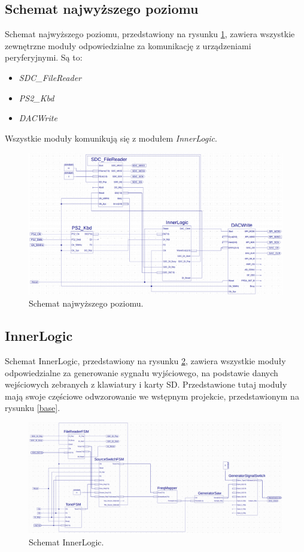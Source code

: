 \documentclass[12pt]{article}
\begin{document}
\subsection{Schemat najwyższego poziomu}
Schemat najwyższego poziomu, przedstawiony na rysunku \ref{sch:main}, zawiera wszystkie zewnętrzne moduły odpowiedzialne za komunikację z urządzeniami peryferyjnymi. Są to:
\begin{itemize}[noitemsep]
  \item \textit{SDC\_FileReader}
  \item \textit{PS2\_Kbd}
  \item \textit{DACWrite}
\end{itemize}
Wszystkie moduły komunikują się z modułem \textit{InnerLogic}.


\begin{figure}[H]
  \centering
  \includegraphics[width=\linewidth]{images/main}
  \caption{Schemat najwyższego poziomu.}
  \label{sch:main}
\end{figure}

\subsection{InnerLogic}

Schemat InnerLogic, przedstawiony na rysunku \ref{sch:inner}, zawiera wszystkie moduły odpowiedzialne za generowanie sygnału wyjściowego, na podstawie danych wejściowych zebranych z klawiatury i karty SD. Przedstawione tutaj moduły mają swoje częściowe odwzorowanie we wstępnym projekcie, przedstawionym na rysunku \ref{base}.

\begin{figure}[H]
  \centering
  \includegraphics[width=\linewidth]{images/inner}
  \caption{Schemat InnerLogic.}
  \label{sch:inner}
\end{figure}
\end{document}

